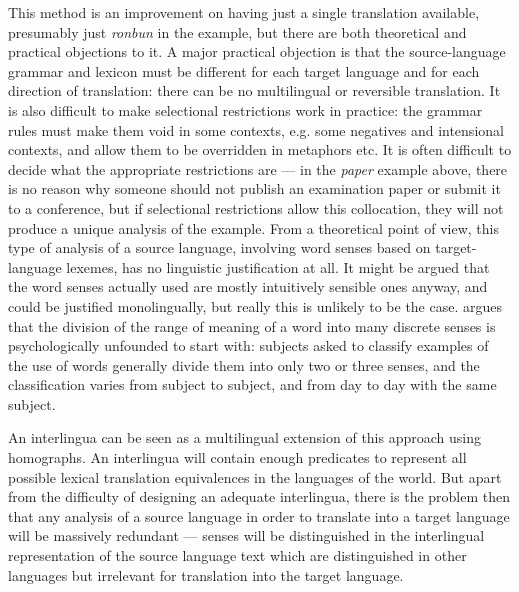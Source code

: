 This method is an improvement on having just a single translation
available, presumably just
{\it ronbun\/}
in the example, but there are both theoretical and practical objections to
it. A major practical objection is that the source-language
grammar and lexicon must be different for each target language and for each
direction of translation: there can be no multilingual or reversible
translation.
It is also difficult to make selectional restrictions work in practice:
the grammar rules must make them void in some contexts, e.g. some negatives and
intensional contexts, and allow them to be overridden in metaphors etc.
It is often difficult to decide what the appropriate restrictions are
--- in the 
{\it paper\/}
example above, there is no reason why someone should not publish an
examination paper or submit it to a conference, but if selectional
restrictions allow this collocation, they will not produce a unique
analysis of the example.
From a theoretical point of view, this type of analysis of a source
language, involving word senses
based on target-language lexemes, has no linguistic justification at all.
It might be argued that the word senses actually used are mostly intuitively
sensible ones anyway, and could be justified monolingually, but really this is
unlikely to be the case. 
\cite{jorgensen:90:a} argues that the division of
the range of meaning of a word into many discrete senses is psychologically
unfounded to start with: subjects asked to classify examples of the use
of words generally
divide them into only two or three senses, and the classification varies
from subject to subject, and from day to day with the same subject.

An interlingua can be seen as a multilingual extension of this approach
using homographs. An 
interlingua will contain enough predicates to represent all possible
lexical translation equivalences in the languages of the world. But apart
from the difficulty of designing an adequate interlingua, there is the
problem then that any analysis of a source language in order to translate
into a target language will be massively redundant --- senses will be
distinguished in the interlingual representation of the source language
text which are distinguished in other languages but irrelevant for
translation into the target language.

